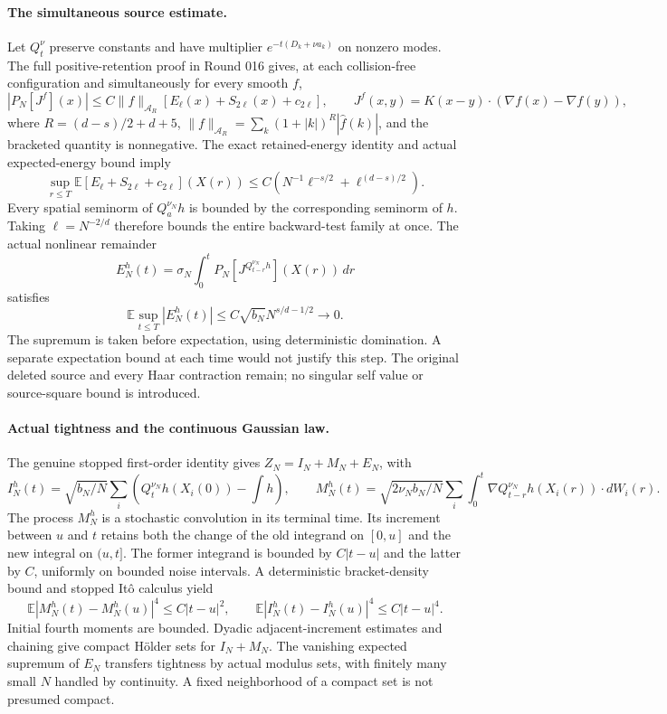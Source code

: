 \documentclass[10pt]{article}
\newcommand{\E}{\mathbb E}
\begin{document}
\paragraph{The simultaneous source estimate.}
Let $Q_t^\nu$ preserve constants and have multiplier $e^{-t(D_k+\nu a_k)}$ on nonzero modes. The full positive-retention proof in Round 016 gives, at each collision-free configuration and simultaneously for every smooth $f$,
\[
 |P_N[J^f](x)|\le C\|f\|_{\mathcal A_R}
       [E_\ell(x)+S_{2\ell}(x)+c_{2\ell}],\qquad
 J^f(x,y)=K(x-y)\cdot(\nabla f(x)-\nabla f(y)),
\]
where $R=(d-s)/2+d+5$, $\|f\|_{\mathcal A_R}=\sum_k(1+|k|)^R|\widehat f(k)|$, and the bracketed quantity is nonnegative. The exact retained-energy identity and actual expected-energy bound imply
\[
 \sup_{r\le T}\E[E_\ell+S_{2\ell}+c_{2\ell}](X(r))
 \le C(N^{-1}\ell^{-s/2}+\ell^{(d-s)/2}).
\]
Every spatial seminorm of $Q_a^{\nu_N}h$ is bounded by the corresponding seminorm of $h$. Taking $\ell=N^{-2/d}$ therefore bounds the entire backward-test family at once. The actual nonlinear remainder
\[
 E_N^h(t)=\sigma_N\int_0^tP_N[J^{Q_{t-r}^{\nu_N}h}](X(r))\,dr
\]
satisfies
\[
 \E\sup_{t\le T}|E_N^h(t)|\le C\sqrt{b_N}N^{s/d-1/2}\longrightarrow0.
\]
The supremum is taken before expectation, using deterministic domination. A separate expectation bound at each time would not justify this step. The original deleted source and every Haar contraction remain; no singular self value or source-square bound is introduced.

\paragraph{Actual tightness and the continuous Gaussian law.}
The genuine stopped first-order identity gives $Z_N=I_N+M_N+E_N$, with
\[
 I_N^h(t)=\sqrt{b_N/N}\sum_i\left(Q_t^{\nu_N}h(X_i(0))-\int h\right),\qquad
 M_N^h(t)=\sqrt{2\nu_Nb_N/N}\sum_i\int_0^t
       \nabla Q_{t-r}^{\nu_N}h(X_i(r))\cdot dW_i(r).
\]
The process $M_N^h$ is a stochastic convolution in its terminal time. Its increment between $u$ and $t$ retains both the change of the old integrand on $[0,u]$ and the new integral on $(u,t]$.
The former integrand is bounded by $C|t-u|$ and the latter by $C$, uniformly on bounded noise intervals. A deterministic bracket-density bound and stopped It\^o calculus yield
\[
 \E|M_N^h(t)-M_N^h(u)|^4\le C|t-u|^2,
 \qquad \E|I_N^h(t)-I_N^h(u)|^4\le C|t-u|^4.
\]
Initial fourth moments are bounded. Dyadic adjacent-increment estimates and chaining give compact H\"older sets for $I_N+M_N$. The vanishing expected supremum of $E_N$ transfers tightness by actual modulus sets, with finitely many small $N$ handled by continuity. A fixed neighborhood of a compact set is not presumed compact.
\end{document}
